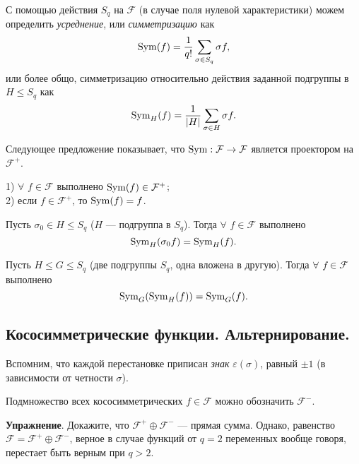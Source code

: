  
С помощью действия $S_q$ на $\mathcal{F} $ (в случае поля нулевой характеристики) 
можем определить {\it усреднение}, или {\it симметризацию} как
$$\mathop{\rm Sym}\nolimits (f) = \dfrac{1}{q!} \sum\limits_{\sigma \in S_q} \sigma f , $$
или более общо, симметризацию относительно действия заданной подгруппы в $H\leq S_q$
как $$\mathop{\rm Sym}\nolimits_H(f) = \dfrac{1}{|H|} \sum\limits_{\sigma \in H} \sigma f .$$

Следующее предложение показывает, что  $\mathop{\rm Sym}\nolimits : \mathcal{F} \to \mathcal{F}$ является проектором на 
$\mathcal{F}^+$.

\begin{predl}
1) $\forall$ $f \in \mathcal{F} $ выполнено $\mathop{\rm Sym}\nolimits (f) \in \mathcal{F}^+ $;\\
2) если $f \in \mathcal{F}^+ $, то $\mathop{\rm Sym}\nolimits (f)=f$.
\end{predl}



\begin{lem}\label{premix}
Пусть $\sigma_0 \in H \leq S_q$ ($H$ --- подгруппа в  $S_q$). Тогда
$\forall$ $f \in \mathcal{F} $ выполнено
$$\mathop{\rm Sym}\nolimits_H(\sigma_0f) = \mathop{\rm Sym}\nolimits_H (f) .$$
\end{lem}


 
\begin{lem}\label{double_mix}
Пусть $H\leq G\leq S_q$ (две подгруппы $S_q$, одна вложена в другую). Тогда
$\forall$ $f \in \mathcal{F} $ выполнено
$$\mathop{\rm Sym}\nolimits_G (\mathop{\rm Sym}\nolimits_H(f)) = \mathop{\rm Sym}\nolimits_G (f) .$$
\end{lem}



\subsection{Кососимметрические функции. Альтернирование.}

Вспомним, что каждой перестановке приписан {\it знак} $\varepsilon(\sigma)$, 
равный $\pm 1$ (в зависимости от четности $\sigma$).


Подмножество всех кососимметрических $f\in \mathcal{F}$ можно обозначить $\mathcal{F}^-$.

{\bf Упражнение}. Докажите, что  $\mathcal{F}^+ \oplus \mathcal{F}^-$ --- прямая сумма.
Однако, равенство $\mathcal{F} = \mathcal{F}^+ \oplus \mathcal{F}^-$, верное в случае функций от $q=2$ переменных вообще говоря, перестает быть верным при $q>2$.


